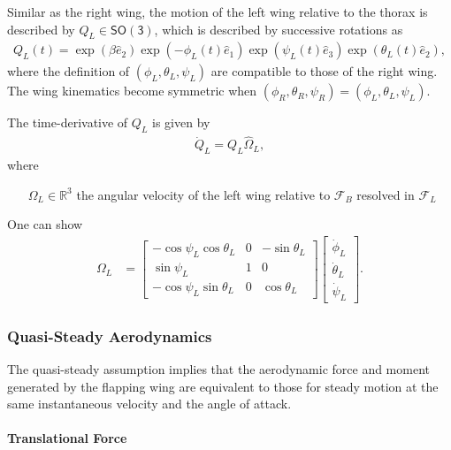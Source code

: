 \documentclass[10pt]{article}
\newcommand{\SO}{\ensuremath{\mathsf{SO(3)}}}
\renewcommand{\Re}{\ensuremath{\mathbb{R}}}
\begin{document}
Similar as the right wing, the motion of the left wing relative to the thorax is described by $Q_L\in\SO$, which is described by successive rotations as
\begin{align*}
    Q_L(t) = \exp(\beta \hat e_2)\exp(-\phi_L(t) \hat e_1) \exp(\psi_L(t) \hat e_3) \exp(\theta_L(t) \hat e_2),
\end{align*}
where the definition of $(\phi_L,\theta_L,\psi_L)$ are compatible to those of the right wing.
The wing kinematics become symmetric when $(\phi_R,\theta_R,\psi_R)=(\phi_L,\theta_L,\psi_L)$. 

The time-derivative of $Q_L$ is given by
\begin{align*}
    \dot Q_L = Q_L \hat \Omega_L,
\end{align*}
where
\begin{itemize}[leftmargin=2.5cm]
    \item[$\Omega_L\in\Re^3$]  the angular velocity of the left wing relative to $\mathcal{F}_B$ resolved in $\mathcal{F}_L$
\end{itemize}
One can show
\begin{align*}
    \Omega_L & =
    \begin{bmatrix} 
        -\cos\psi_L\cos\theta_L & 0 & -\sin\theta_L \\
        \sin\psi_L & 1 & 0 \\
        -\cos\psi_L\sin\theta_L& 0& \cos\theta_L
    \end{bmatrix}
    \begin{bmatrix}
        \dot\phi_L \\ \dot\theta_L \\ \dot\psi_L
    \end{bmatrix}.
\end{align*}

\subsubsection{Quasi-Steady Aerodynamics}

The quasi-steady assumption implies that the aerodynamic force and moment generated by the flapping wing are equivalent to those for steady motion at the same instantaneous velocity and the angle of attack. 

\paragraph{Translational Force}
\end{document}
